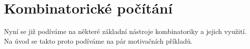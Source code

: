 \chapter{Kombinatorické počítání}

Nyní se již podíváme na některé základní nástroje kombinatoriky a jejich využití. Na úvod se takto proto podíváme na pár motivačních příkladů.



